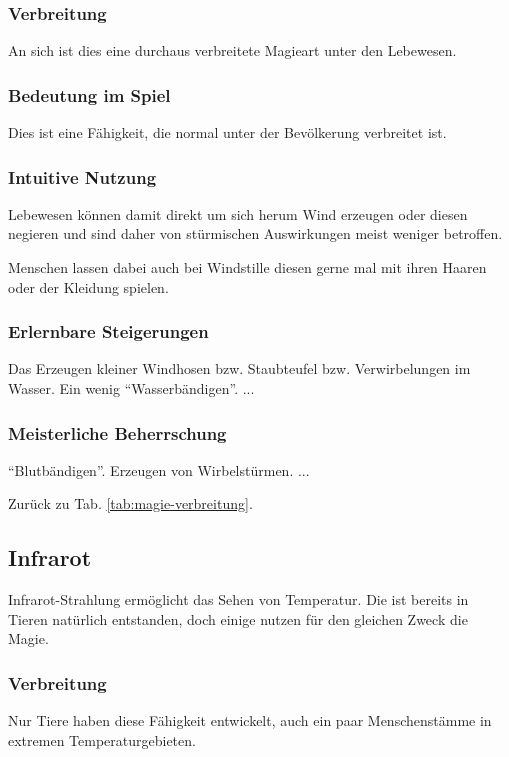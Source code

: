 \subsubsection{Verbreitung}
An sich ist dies eine durchaus verbreitete Magieart unter den Lebewesen.

\subsubsection{Bedeutung im Spiel}
Dies ist eine Fähigkeit, die normal unter der Bevölkerung verbreitet ist.

\subsubsection{Intuitive Nutzung}
Lebewesen können damit direkt um sich herum Wind erzeugen oder diesen negieren und sind daher von stürmischen Auswirkungen meist weniger betroffen.

Menschen lassen dabei auch bei Windstille diesen gerne mal mit ihren Haaren oder der Kleidung spielen.

\subsubsection{Erlernbare Steigerungen}
\begin{outline}
	\1 Das Erzeugen kleiner Windhosen bzw. Staubteufel bzw. Verwirbelungen im Wasser.
	\1 Ein wenig "`Wasserbändigen"'.
	\1 ...
\end{outline}

\subsubsection{Meisterliche Beherrschung} 
\begin{outline}
	\1 "`Blutbändigen"'.
	\1 Erzeugen von Wirbelstürmen.
	\1 ...
\end{outline}
Zurück zu Tab. \ref{tab:magie-verbreitung}.



\subsection{Infrarot}\label{magie:infrarot}
Infrarot-Strahlung ermöglicht das Sehen von Temperatur. 
Die ist bereits in Tieren natürlich entstanden, doch einige nutzen für den gleichen Zweck die Magie.

\subsubsection{Verbreitung}
Nur Tiere haben diese Fähigkeit entwickelt, auch ein paar Menschenstämme in extremen Temperaturgebieten.

